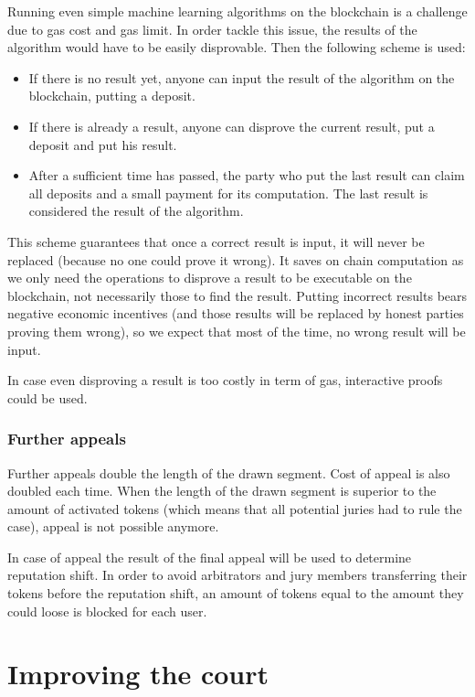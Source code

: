 \documentclass[12 pt]{article}
\begin{document}
Running even simple machine learning algorithms on the blockchain is a challenge due to gas cost and gas limit.
In order tackle this issue, the results of the algorithm would have to be easily disprovable. Then the following scheme is used:
\begin{itemize}
    \item If there is no result yet, anyone can input the result of the algorithm on the blockchain, putting a deposit.
    \item If there is already a result, anyone can disprove the current result, put a deposit and put his result.
    \item After a sufficient time has passed, the party who put the last result can claim all deposits and a small payment for its computation. The last result is considered the result of the algorithm.
\end{itemize}
This scheme guarantees that once a correct result is input, it will never be replaced (because no one could prove it wrong).
It saves on chain computation as we only need the operations to disprove a result to be executable on the blockchain, not necessarily those to find the result. Putting incorrect results bears negative economic incentives (and those results will be replaced by honest parties proving them wrong), so we expect that most of the time, no wrong result will be input.

In case even disproving a result is too costly in term of gas, interactive proofs could be used\cite{linteractproof}.


\subsubsection{Further appeals}

Further appeals double the length of the drawn segment. Cost of appeal is also doubled each time. When the length of the drawn segment is superior to the amount of activated tokens (which means that all potential juries had to rule the case), appeal is not possible anymore.

In case of appeal the result of the final appeal will be used to determine reputation shift. In order to avoid arbitrators and jury members transferring their tokens before the reputation shift, an amount of tokens equal to the amount they could loose is blocked for each user.



\section{Improving the court}
\end{document}
